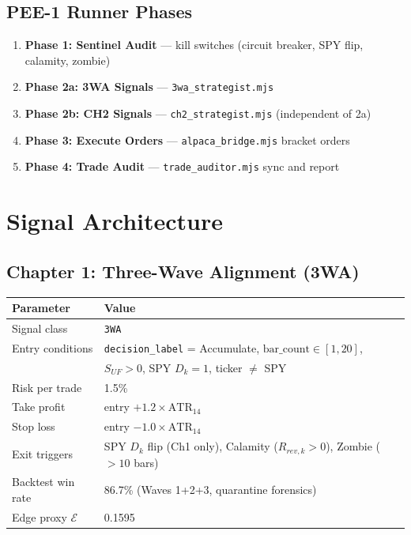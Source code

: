 \documentclass[11pt, a4paper]{article}
\begin{document}
\subsection{PEE-1 Runner Phases}

\begin{enumerate}
  \item \textbf{Phase 1: Sentinel Audit} --- kill switches (circuit breaker, SPY flip, calamity, zombie)
  \item \textbf{Phase 2a: 3WA Signals} --- \texttt{3wa\_strategist.mjs}
  \item \textbf{Phase 2b: CH2 Signals} --- \texttt{ch2\_strategist.mjs} (independent of 2a)
  \item \textbf{Phase 3: Execute Orders} --- \texttt{alpaca\_bridge.mjs} bracket orders
  \item \textbf{Phase 4: Trade Audit} --- \texttt{trade\_auditor.mjs} sync and report
\end{enumerate}

\section{Signal Architecture}

\subsection{Chapter 1: Three-Wave Alignment (3WA)}

\begin{center}
\begin{tabular}{@{}ll@{}}
\toprule
\textbf{Parameter} & \textbf{Value} \\
\midrule
Signal class & \texttt{3WA} \\
Entry conditions & \texttt{decision\_label} = Accumulate, $\text{bar\_count} \in [1, 20]$, \\
                 & $S_{UF} > 0$, SPY $D_k = 1$, ticker $\neq$ SPY \\
Risk per trade & 1.5\% \\
Take profit & entry $+ 1.2 \times \text{ATR}_{14}$ \\
Stop loss & entry $- 1.0 \times \text{ATR}_{14}$ \\
Exit triggers & SPY $D_k$ flip (Ch1 only), Calamity ($R_{rev,k} > 0$), Zombie ($> 10$ bars) \\
Backtest win rate & 86.7\% (Waves 1+2+3, quarantine forensics) \\
Edge proxy $\mathcal{E}$ & 0.1595 \\
\bottomrule
\end{tabular}
\end{center}
\end{document}
